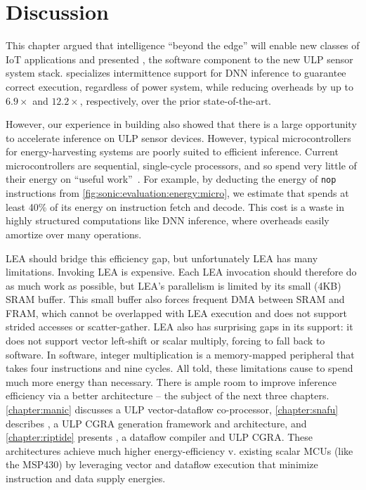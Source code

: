 \section{Discussion}
\label{sonic:discuss}
This chapter argued that intelligence ``beyond the edge'' will enable
new classes of IoT applications and presented \sonic, the software component to the new ULP sensor system stack.
% 
\sonic specializes intermittence support for DNN inference to guarantee correct
execution, regardless of power system, while reducing overheads by
up to $6.9\times$ and $12.2\times$, respectively, over the prior state-of-the-art.

However, our experience in building \sonictails also showed that there is a large
opportunity to accelerate inference on ULP sensor devices.
% 
However, typical microcontrollers for energy-harvesting systems are poorly
suited to efficient inference.
% 
Current microcontrollers are sequential, single-cycle processors,
and so spend very little of their energy on ``useful work''~\cite{horowitz:isscc14:energy-keynote}.
%
For example, by deducting the energy of \texttt{nop} instructions from \autoref{fig:sonic:evaluation:energy:micro},
we estimate that \sonic spends at least 40\% of its energy on instruction fetch and decode.
%
This cost is a waste in highly structured computations like DNN inference,
where overheads easily amortize over many operations. %

LEA should bridge this efficiency gap, but unfortunately LEA has many limitations.
%
Invoking LEA is expensive. Each LEA invocation should therefore do as much work as
possible, but LEA's parallelism is limited by its small (4KB) SRAM buffer.
%
This small buffer also forces frequent DMA between SRAM and FRAM,
which cannot be overlapped with LEA execution
and does not support strided accesses or scatter-gather.
%
LEA also has surprising gaps in its support:
it does not support vector left-shift or scalar multiply,
forcing \tails to fall back to software.
%
In software, integer multiplication is a memory-mapped peripheral that takes
four instructions and nine cycles.
%
All told, these limitations cause \sonictails to spend much more energy than necessary.
% 
There is ample room to improve inference efficiency via a better architecture -- the subject of the next three chapters.
% 
\autoref{chapter:manic} discusses \manic a ULP vector-dataflow co-processor, \autoref{chapter:snafu} describes \snafu, a ULP CGRA generation framework and architecture, and \autoref{chapter:riptide} presents \riptide, a dataflow compiler and ULP CGRA.
% 
These architectures achieve much higher energy-efficiency v. existing scalar MCUs (like the MSP430) by leveraging vector and dataflow execution that minimize instruction and data supply energies.

